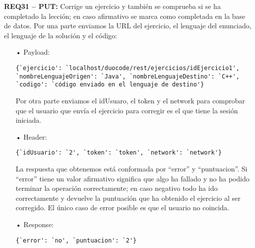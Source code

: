 \textbf{REQ31 – PUT:} Corrige un ejercicio y también se comprueba si se ha completado la lección; en caso afirmativo se marca como completada en la base de datos. Por una parte enviamos la URL del ejercicio, el lenguaje del enunciado, el lenguaje de la solución y el código:
\begin{itemize}
\item[•]
Payload: 
{\codesize
\begin{verbatim}
{`ejercicio': `localhost/duocode/rest/ejercicios/idEjercicio1', 
`nombreLenguajeOrigen': `Java', `nombreLenguajeDestino': `C++', 
`codigo': `código enviado en el lenguaje de destino'} 
\end{verbatim}
}

Por otra parte enviamos el idUsuaro, el token y el network para comprobar que el usuario que envía el ejercicio para corregir es el que tiene la sesión iniciada.
\item[•]
Header: 
{\codesize
\begin{verbatim}
{`idUsuario': `2', `token': `token', `network': `network'}
\end{verbatim}
}

La respuesta que obtenemos está conformada por ``error'' y ``puntuacion''. Si ``error'' tiene un valor afirmativo significa que algo ha fallado y no ha podido terminar la operación correctamente; en caso negativo todo ha ido correctamente y devuelve la puntuación que ha obtenido el ejercicio al ser corregido. El único caso de error posible es que el usuario no coincida.
\item[•]
Response: 
{\codesize
\begin{verbatim}
{`error': `no', `puntuacion': `2'}
\end{verbatim}
}
\end{itemize}
